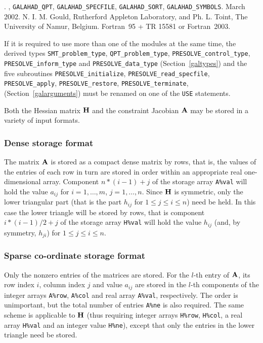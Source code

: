 \documentclass{galahad}
\newcommand{\packagename}{PRESOLVE}
\newcommand{\fullpackagename}{\libraryname\_\packagename}
\begin{document}
\galattributes
\galversions{\tt  \fullpackagename\_single, \fullpackagename\_double}.
, {\tt GAL\-AHAD\_QPT}, {\tt GALAHAD\_SPECFILE},
{\tt GALAHAD\_SORT}, {\tt GALAHAD\_SYMBOLS}.
\galdate March 2002.
\galorigin N. I. M. Gould, Rutherford Appleton Laboratory, and
Ph. L. Toint, The University of Namur, Belgium.
\gallanguage Fortran~95 + TR 15581 or Fortran~2003.


\galhowto



\noindent
If it is required to use more than one of the modules at the same time, 
the derived types
{\tt SMT\_problem\_type},
{\tt QPT\_problem\_type},
{\tt \packagename\_control\_type},
{\tt \packagename\_inform\_type}
and
{\tt \packagename\_data\_type}
(Section~\ref{galtypes})
and the five subroutines
{\tt \packagename\_initialize},
{\tt \packagename\_read\_specfile},
{\tt \packagename\_apply},
{\tt \packagename\_restore},
{\tt \packagename\_terminate},
(Section~\ref{galarguments})
must be renamed on one of the {\tt USE} statements.


\galmatrix

Both the Hessian matrix ${\mathbf{H}}$ and the constraint Jacobian ${\mathbf{A}}$
may be stored in a variety of input formats.

\subsubsection{Dense storage format}\label{dense}
The matrix ${\mathbf{A}}$ is stored as a compact
dense matrix by rows, that is, the values of the entries of each row in turn are
stored in order within an appropriate real one-dimensional array.
Component $n \ast (i-1) + j$ of the storage array {\tt A\%val} will hold the
value $a_{ij}$ for $i = 1, \ldots , m$, $j = 1, \ldots , n$.
Since ${\mathbf{H}}$ is symmetric, only the lower triangular part (that is the part
$h_{ij}$ for $1 \leq j \leq i \leq n$) need be held. In this case
the lower triangle will be stored by rows, that is
component $i \ast (i-1)/2 + j$ of the storage array {\tt H\%val}
will hold the value $h_{ij}$ (and, by symmetry, $h_{ji}$)
for $1 \leq j \leq i \leq n$.

\subsubsection{Sparse co-ordinate storage format}\label{coordinate}
Only the nonzero entries of the matrices are stored. For the
$l$-th entry of ${\mathbf{A}}$, its row index $i$, column index $j$
and value $a_{ij}$
are stored in the $l$-th components of the integer arrays {\tt A\%row},
{\tt A\%col} and real array {\tt A\%val}, respectively.
The order is unimportant, but the total
number of entries {\tt A\%ne} is also required.
The same scheme is applicable to
${\mathbf{H}}$ (thus requiring integer arrays {\tt H\%row}, {\tt H\%col}, a real array
{\tt H\%val} and an integer value {\tt H\%ne}),
except that only the entries in the lower triangle need be stored.
\end{document}
